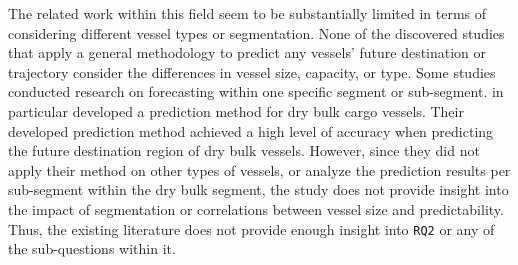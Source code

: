 
The related work within this field seem to be substantially limited in terms of considering different vessel types or segmentation. None of the discovered studies that apply a general methodology to predict any vessels' future destination or trajectory consider the differences in vessel size, capacity, or type. Some studies conducted research on forecasting within one specific segment or sub-segment. \cite{lechtenberg2019} in particular developed a prediction method for dry bulk cargo vessels. Their developed prediction method achieved a high level of accuracy when predicting the future destination region of dry bulk vessels. However, since they did not apply their method on other types of vessels, or analyze the prediction results per sub-segment within the dry bulk segment, the study does not provide insight into the impact of segmentation or correlations between vessel size and predictability. Thus, the existing literature does not provide enough insight into \texttt{RQ2} or any of the sub-questions within it.



